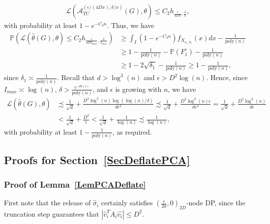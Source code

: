 \documentclass{article}
\newcommand{\thetahat}{\ensuremath{\widehat{\theta}}}
\begin{document}
\begin{align*}
\mathcal{L}\left(\mathcal{A}_{TC}^{\left(\epsilon/(4Dx), \delta/x\right)}(G), \theta\right) \leq C_2h_{\frac{\epsilon}{4Dx}, \frac{\delta}{x}},
\end{align*}
with probability at least $1 - e^{-C_3n}$. Thus, we have
\begin{align*}
\mathbb{P}\left(\mathcal{L}\left(\thetahat(G), \theta\right) \leq C_2h_{\frac{\epsilon}{4DI_{max}}, \frac{\delta}{I_{max}}}\right) &\geq \int_I\left(1 - e^{-C_3n}\right)f_{X_{\epsilon_1, \delta_1}}(x)dx - \frac{1}{\mathrm{poly}(n)}\\
&\geq 1 - \frac{1}{\mathrm{poly}(n)} - \mathbb{P}(F_1^c) - \frac{1}{\mathrm{poly}(n)}\\
&\geq 1 - 2\sqrt{\delta_1} - \frac{1}{\mathrm{poly}(n)} \geq 1 - \frac{1}{\mathrm{poly}(n)},
\end{align*}
since $\delta_1 \asymp \frac{1}{\mathrm{poly}(n)}$. Recall that $d > \log^3(n)$ and $\epsilon > D^2\log(n)$. Hence, since $I_{max} \asymp \log(n)$, $\delta > \frac{e^{-\Theta(\epsilon)}}{\mathrm{poly}(n)}$, and $\epsilon$ is growing with $n$, we have
\begin{align*}
\mathcal{L}\left(\thetahat(G), \theta\right) &\precsim \frac{1}{\sqrt{d}} + \frac{D^2\log^2(n)\log(\log(n)/\delta)}{d\epsilon^2} \precsim \frac{1}{\sqrt{d}} + \frac{D^2\log^3(n)\epsilon}{d\epsilon^2} = \frac{1}{\sqrt{d}} + \frac{D^2\log^3(n)}{d\epsilon}\\
&< \frac{1}{\sqrt{d}} + \frac{D^2}{\epsilon} < \frac{1}{\sqrt{d}} + \frac{1}{\log(n)} \precsim \frac{1}{\log(n)},
\end{align*}
with probability at least $1 - \frac{1}{\mathrm{poly}(n)}$, as required.


\subsection{Proofs for Section~\ref{SecDeflatePCA}}

\subsubsection{Proof of Lemma~\ref{LemPCADeflate}}
\label{AppLemPCADeflate}

First note that the release of $\hat{\sigma}_i$ certainly satisfies $\left(\frac{\epsilon}{2k}, 0\right)_{2D}$-node DP, since the truncation step guarantees that $|\hat{v}_i^T A_i \hat{v_i}| \le D^2$.
\end{document}
